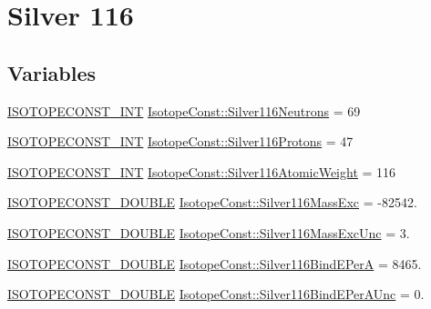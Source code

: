 \hypertarget{group___isotope_const-_silver-_ag116}{}\section{Silver 116}
\label{group___isotope_const-_silver-_ag116}
\subsection*{Variables}
\begin{DoxyCompactItemize}
\item 
\mbox{\hyperlink{group___isotope_const-_macros_ga5f18360b3e99483a35c32d789e62621c}{I\+S\+O\+T\+O\+P\+E\+C\+O\+N\+S\+T\+\_\+\+I\+NT}} \mbox{\hyperlink{group___isotope_const-_silver-_ag116_gae599f76813d78198666cad759de8ec45}{Isotope\+Const\+::\+Silver116\+Neutrons}} = 69
\item 
\mbox{\hyperlink{group___isotope_const-_macros_ga5f18360b3e99483a35c32d789e62621c}{I\+S\+O\+T\+O\+P\+E\+C\+O\+N\+S\+T\+\_\+\+I\+NT}} \mbox{\hyperlink{group___isotope_const-_silver-_ag116_gac419e59efb51b3c1b01862cd19865f33}{Isotope\+Const\+::\+Silver116\+Protons}} = 47
\item 
\mbox{\hyperlink{group___isotope_const-_macros_ga5f18360b3e99483a35c32d789e62621c}{I\+S\+O\+T\+O\+P\+E\+C\+O\+N\+S\+T\+\_\+\+I\+NT}} \mbox{\hyperlink{group___isotope_const-_silver-_ag116_gae07e5c01fdd92287cbb2d7019f26db16}{Isotope\+Const\+::\+Silver116\+Atomic\+Weight}} = 116
\item 
\mbox{\hyperlink{group___isotope_const-_macros_ga8f45a7272ce02c0b4c65c44636ed719a}{I\+S\+O\+T\+O\+P\+E\+C\+O\+N\+S\+T\+\_\+\+D\+O\+U\+B\+LE}} \mbox{\hyperlink{group___isotope_const-_silver-_ag116_ga30c624eba67f3a08fce0fbc9ba620555}{Isotope\+Const\+::\+Silver116\+Mass\+Exc}} = -\/82542.
\item 
\mbox{\hyperlink{group___isotope_const-_macros_ga8f45a7272ce02c0b4c65c44636ed719a}{I\+S\+O\+T\+O\+P\+E\+C\+O\+N\+S\+T\+\_\+\+D\+O\+U\+B\+LE}} \mbox{\hyperlink{group___isotope_const-_silver-_ag116_ga2871d0f3c23dfc25558692f8940b4f65}{Isotope\+Const\+::\+Silver116\+Mass\+Exc\+Unc}} = 3.
\item 
\mbox{\hyperlink{group___isotope_const-_macros_ga8f45a7272ce02c0b4c65c44636ed719a}{I\+S\+O\+T\+O\+P\+E\+C\+O\+N\+S\+T\+\_\+\+D\+O\+U\+B\+LE}} \mbox{\hyperlink{group___isotope_const-_silver-_ag116_ga65da00cd9dc3c7b99c81848c13e752c0}{Isotope\+Const\+::\+Silver116\+Bind\+E\+PerA}} = 8465.
\item 
\mbox{\hyperlink{group___isotope_const-_macros_ga8f45a7272ce02c0b4c65c44636ed719a}{I\+S\+O\+T\+O\+P\+E\+C\+O\+N\+S\+T\+\_\+\+D\+O\+U\+B\+LE}} \mbox{\hyperlink{group___isotope_const-_silver-_ag116_ga3adbad2fedf5f122739e58149c8028cc}{Isotope\+Const\+::\+Silver116\+Bind\+E\+Per\+A\+Unc}} = 0.

\end{DoxyCompactItemize}
